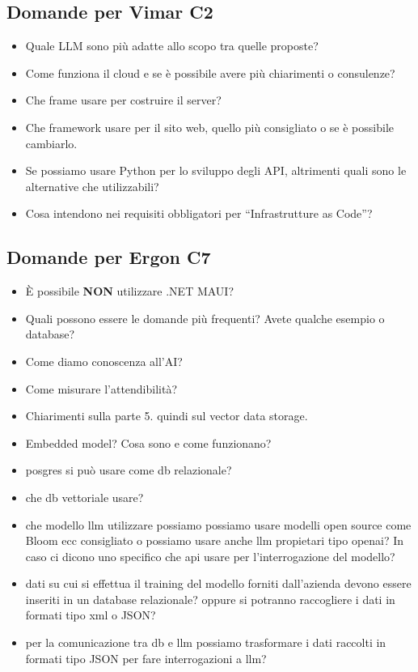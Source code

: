 \documentclass{article}
\begin{document}
\subsection{Domande per Vimar C2}\label{subsec:domande-vimar}
\begin{itemize}
    \item Quale LLM sono più adatte allo scopo tra quelle proposte?
    \item Come funziona il cloud e se è possibile avere più chiarimenti o consulenze?
    \item Che frame usare per costruire il server?
    \item Che framework usare per il sito web, quello più consigliato o se è possibile cambiarlo.
    \item Se possiamo usare Python per lo sviluppo degli API, altrimenti quali sono le alternative che utilizzabili?
    \item Cosa intendono nei requisiti obbligatori per “Infrastrutture as Code”?
\end{itemize}

\subsection{Domande per Ergon C7}\label{subsec:domande-ergon}
\begin{itemize}
    \item È possibile \textbf{NON} utilizzare .NET MAUI?
    \item Quali possono essere le domande più frequenti? Avete qualche esempio o database?
    \item Come diamo conoscenza all'AI?
    \item Come misurare l'attendibilità?
    \item Chiarimenti sulla parte 5. quindi sul vector data storage.
    \item Embedded model? Cosa sono e come funzionano?
    \item posgres si può usare come db relazionale?
    \item che db vettoriale usare?
    \item che modello llm utilizzare possiamo possiamo usare modelli open source come Bloom ecc consigliato o possiamo usare anche llm propietari tipo openai? In caso ci dicono uno specifico che api usare per l'interrogazione del modello?
    \item  dati su cui si effettua il training del modello forniti dall'azienda devono essere inseriti in un database relazionale? oppure si potranno raccogliere i dati in formati tipo xml o JSON?
    \item per la comunicazione tra db e llm possiamo trasformare i dati raccolti in formati tipo JSON per fare interrogazioni a llm?
\end{itemize}
\end{document}

